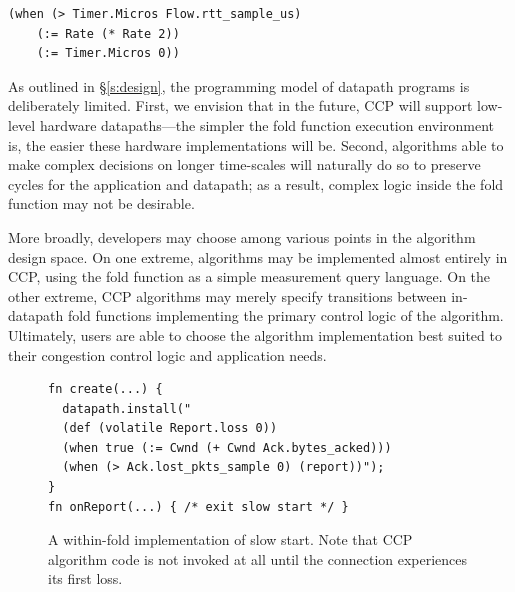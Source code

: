 {\footnotesize
\begin{verbatim}
(when (> Timer.Micros Flow.rtt_sample_us)
    (:= Rate (* Rate 2))
    (:= Timer.Micros 0))
\end{verbatim}
}

 As outlined in \S\ref{s:design}, the programming model of datapath programs is deliberately limited.
First, we envision that in the future, CCP will support low-level hardware datapaths---the simpler the fold function execution environment is, the easier these hardware implementations will be. Second, algorithms able to make complex decisions on longer time-scales will naturally do so to preserve cycles for the application and datapath; as a result, complex logic inside the fold function may not be desirable.

More broadly, developers may choose among various points in the algorithm design space. 
On one extreme, algorithms may be implemented almost entirely in CCP, using the fold function as a simple measurement query language.
On the other extreme, CCP algorithms may merely specify transitions between in-datapath fold functions implementing the primary control logic of the algorithm.
Ultimately, users are able to choose the algorithm implementation best suited to their congestion control logic and application needs.

\begin{figure}[t]
{\footnotesize
\begin{verbatim}
fn create(...) {
  datapath.install("
  (def (volatile Report.loss 0))
  (when true (:= Cwnd (+ Cwnd Ack.bytes_acked)))
  (when (> Ack.lost_pkts_sample 0) (report))");
}
fn onReport(...) { /* exit slow start */ }
\end{verbatim}
}
\caption{A within-fold implementation of slow start. Note that CCP algorithm code is not invoked at all until the connection experiences its first loss.} \label{lst:ccp:ssfold}
\end{figure}